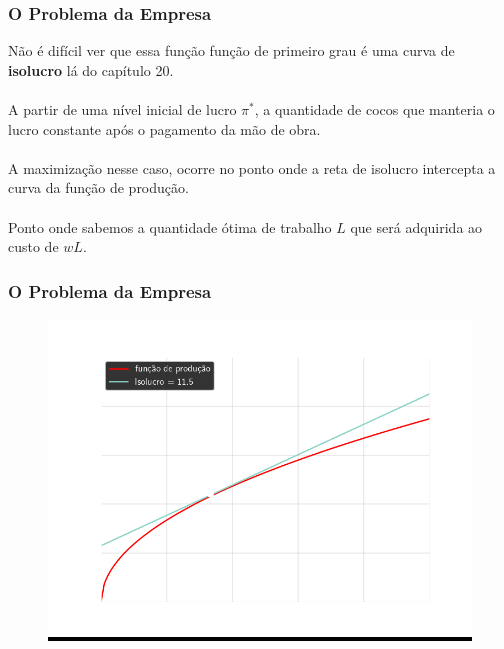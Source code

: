 \documentclass{beamer}[10]
\begin{document}
\begin{frame}
	\frametitle{O Problema da Empresa}

	Não é difícil ver que essa função função de primeiro grau é uma curva de \textbf{isolucro} lá do capítulo 20.
	\\~\\
	A partir de uma nível inicial de lucro $\pi^*$, a quantidade de cocos que manteria o lucro constante após o pagamento da mão de obra.
	\\~\\
	A maximização nesse caso, ocorre no ponto onde a reta de isolucro intercepta a curva da função de produção.
	\\~\\
	Ponto onde sabemos a quantidade ótima de trabalho $L$ que será adquirida ao custo de $wL$.

\end{frame}

\begin{frame}
	\frametitle{O Problema da Empresa}

	\begin{figure}[H]
		\centering
		\colorbox{black}{\includegraphics[scale=0.6]{cap33_3-max_lucro.png}}
	\end{figure}

\end{frame}
\end{document}
